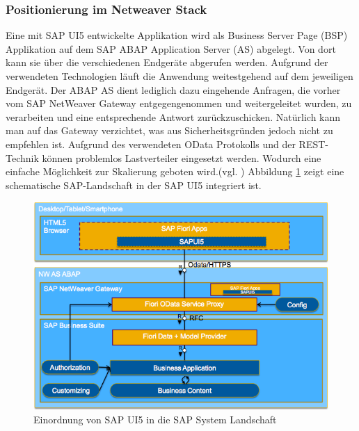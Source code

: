 \subsubsection{Positionierung im Netweaver Stack}
Eine mit SAP UI5 entwickelte Applikation wird als Business Server Page (BSP) Applikation auf dem SAP ABAP Application Server (AS) abgelegt. Von dort kann sie über die verschiedenen Endgeräte abgerufen werden. Aufgrund der verwendeten Technologien läuft die Anwendung weitestgehend auf dem jeweiligen Endgerät. Der ABAP AS dient lediglich dazu eingehende Anfragen, die vorher vom SAP NetWeaver Gateway entgegengenommen und weitergeleitet wurden, zu verarbeiten und eine entsprechende Antwort zurückzuschicken. Natürlich kann man auf das Gateway verzichtet, was aus Sicherheitsgründen jedoch nicht zu empfehlen ist. Aufgrund des verwendeten OData Protokolls und der REST-Technik können problemlos Lastverteiler eingesetzt werden. Wodurch eine einfache Möglichkeit zur Skalierung geboten wird.(vgl. \cite{SAPFIORIARCH}) Abbildung \ref{fig:sapui5arch} zeigt eine schematische SAP-Landschaft in der SAP UI5 integriert ist.

\vspace{1em}
\begin{figure}[htb]
  \centering
  \includegraphics[width=0.8\linewidth]{abb/sap_ui5_architecture}
  \caption[Einordnung von SAP UI5 in die SAP System Landschaft]{Einordnung von SAP UI5 in die SAP System Landschaft \cite{SAPFIORIARCH}}
  \label{fig:sapui5arch}
\end{figure}